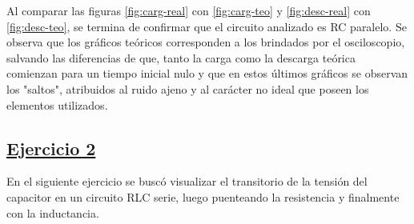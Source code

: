 \documentclass[a4paper]{article}
\begin{document}

Al comparar las figuras \ref{fig:carg-real} con \ref{fig:carg-teo} y \ref{fig:desc-real} con \ref{fig:desc-teo}, se termina de confirmar que el circuito analizado es RC paralelo. Se observa que los gráficos teóricos corresponden a los brindados por el osciloscopio, salvando las diferencias de que, tanto la carga como la descarga teórica comienzan para un tiempo inicial nulo y que en estos últimos gráficos se observan los "saltos", atribuidos al ruido ajeno y al carácter no ideal que poseen los elementos utilizados.

\newpage

\subsection*{\underline{Ejercicio 2}}

\vspace{1em}
En el siguiente ejercicio se buscó visualizar el transitorio de la tensión del capacitor en un circuito RLC serie, luego puenteando la resistencia y finalmente con la inductancia. 
\end{document}
